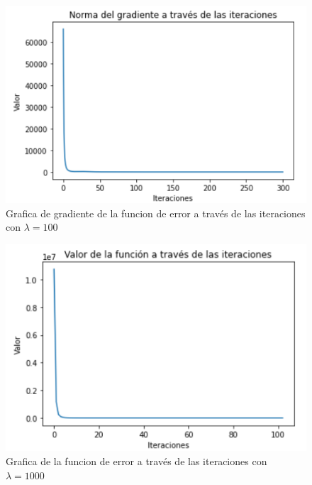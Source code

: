 \documentclass[conference]{IEEEtran}
\begin{document}
\begin{figure}[htbp]
    \centerline{\includegraphics[scale=0.25]{r100g.png}}
    \caption{Grafica de gradiente de la funcion de error a través de las iteraciones con $\lambda=100$}
    \label{r100g}
\end{figure}

\begin{figure}[htbp]
    \centerline{\includegraphics[scale=0.25]{r1000f.png}}
    \caption{Grafica de la funcion de error a través de las iteraciones con $\lambda=1000$}
    \label{r1000f}
\end{figure}
\end{document}
